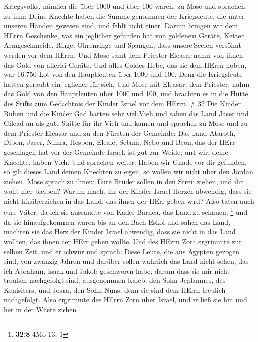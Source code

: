 Kriegsvolks, nämlich die über 1000 und über 100 waren, zu Mose
 und sprachen zu ihm: Deine Knechte haben die Summe
genommen der Kriegsleute, die unter unseren Händen gewesen sind, und
fehlt nicht einer.  Darum bringen wir dem HErrn Geschenke,
was ein jeglicher gefunden hat von goldenem Geräte, Ketten,
Armgeschmeide, Ringe, Ohrenringe und Spangen, dass unsere Seelen
versöhnt werden vor dem HErrn.  Und Mose samt dem Priester
Eleasar nahm von ihnen das Gold von allerlei Geräte.  Und
alles Goldes Hebe, das sie dem HErrn hoben, war 16.750 Lot von den
Hauptleuten über 1000 und 100.  Denn die Kriegsleute hatten
geraubt ein jeglicher für sich.  Und Mose mit Eleasar, dem
Priester, nahm das Gold von den Hauptleuten über 1000 und 100, und
brachten es in die Hütte des Stifts zum Gedächtnis der Kinder Israel vor
dem HErrn. \# 32  Die Kinder Ruben und die Kinder Gad hatten
sehr viel Vieh und sahen das Land Jaser und Gilead an als gute Stätte
für ihr Vieh  und kamen und sprachen zu Mose und zu dem
Priester Eleasar und zu den Fürsten der Gemeinde:  Das Land
Ataroth, Dibon, Jaser, Nimra, Hesbon, Eleale, Sebam, Nebo und Beon,
 das der HErr geschlagen hat vor der Gemeinde Israel, ist
gut zur Weide; und wir, deine Knechte, haben Vieh.  Und
sprachen weiter: Haben wir Gnade vor dir gefunden, so gib dieses Land
deinen Knechten zu eigen, so wollen wir nicht über den Jordan ziehen.
 Mose sprach zu ihnen: Eure Brüder sollen in den Streit
ziehen, und ihr wollt hier bleiben?  Warum macht ihr der
Kinder Israel Herzen abwendig, dass sie nicht hinüberziehen in das Land,
das ihnen der HErr geben wird?  Also taten auch eure Väter,
da ich sie aussandte von Kades-Barnea, das Land zu schauen; \footnote{\textbf{32:8}
  4Mo 13,-1}  und da sie hinaufgekommen waren bis an den
Bach Eskol und sahen das Land, machten sie das Herz der Kinder Israel
abwendig, dass sie nicht in das Land wollten, das ihnen der HErr geben
wollte.  Und des HErrn Zorn ergrimmte zur selben Zeit, und
er schwur und sprach:  Diese Leute, die aus Ägypten gezogen
sind, von zwanzig Jahren und darüber sollen wahrlich das Land nicht
sehen, das ich Abraham, Isaak und Jakob geschworen habe, darum dass sie
mir nicht treulich nachgefolgt sind;  ausgenommen Kaleb,
den Sohn Jephunnes, des Kenisiters, und Josua, den Sohn Nuns; denn sie
sind dem HErrn treulich nachgefolgt.  Also ergrimmte des
HErrn Zorn über Israel, und er ließ sie hin und her in der Wüste ziehen
